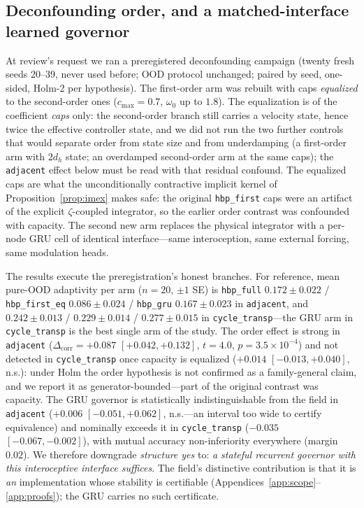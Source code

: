 \documentclass{article}
\begin{document}
\subsection{Deconfounding order, and a matched-interface learned governor}
\label{sec:v4}
At review's request we ran a preregistered deconfounding campaign
(twenty fresh seeds 20--39, never used before; OOD protocol unchanged;
paired by seed, one-sided, Holm-2 per hypothesis). The first-order arm
was rebuilt with caps \emph{equalized} to the second-order ones
($c_{\max}{=}0.7$, $\omega_0$ up to $1.8$). The equalization is of the
coefficient \emph{caps} only: the second-order branch still carries a velocity
state, hence twice the effective controller state, and we did not run the two
further controls that would separate order from state size and from
underdamping (a first-order arm with $2d_h$ state; an overdamped second-order
arm at the same caps); the \texttt{adjacent} effect below must be read with
that residual confound. The equalized caps are what the unconditionally
contractive implicit kernel of Proposition~\ref{prop:imex} makes safe:
the original \texttt{hbp\_first} caps were an artifact of the explicit
$\zeta$-coupled integrator, so the earlier order contrast was confounded
with capacity. The second new arm replaces the physical integrator with
a per-node GRU cell of identical interface---same interoception, same
external forcing, same modulation heads.

The results execute the preregistration's honest branches. For reference, mean
pure-OOD adaptivity per arm ($n{=}20$, $\pm1$ SE) is \texttt{hbp\_full}
$0.172\pm0.022$ / \texttt{hbp\_first\_eq} $0.086\pm0.024$ / \texttt{hbp\_gru}
$0.167\pm0.023$ in \texttt{adjacent}, and $0.242\pm0.013$ / $0.229\pm0.014$ /
$0.277\pm0.015$ in \texttt{cycle\_transp}---the GRU arm in
\texttt{cycle\_transp} is the best single arm of the study. The order
effect is strong in \texttt{adjacent}
($\Delta_{\mathrm{corr}}=+0.087$ $[+0.042,+0.132]$, $t{=}4.0$,
$p{=}3.5\times10^{-4}$) and not detected in \texttt{cycle\_transp} once capacity
is equalized ($+0.014$ $[-0.013,+0.040]$, n.s.): under Holm the order hypothesis is not
confirmed as a family-general claim, and we report it as
generator-bounded---part of the original contrast was capacity. The GRU
governor is statistically indistinguishable from the field in \texttt{adjacent}
($+0.006$ $[-0.051,+0.062]$, n.s.---an interval too wide to certify
equivalence) and
nominally exceeds it in \texttt{cycle\_transp} ($-0.035$
$[-0.067,-0.002]$), with mutual accuracy non-inferiority everywhere
(margin $0.02$). We therefore downgrade \emph{structure yes} to:
\emph{a stateful recurrent governor with this interoceptive interface
suffices}. The field's distinctive contribution is that it is \emph{an}
implementation whose stability is certifiable
(Appendices~\ref{app:scope}--\ref{app:proofs}); the GRU carries no such
certificate.
\end{document}
